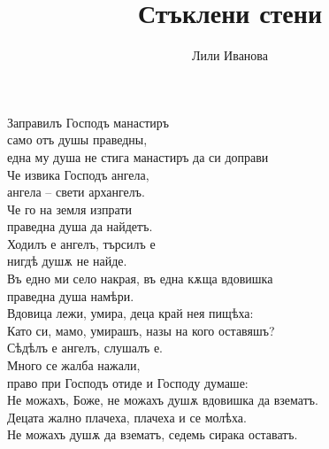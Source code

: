 \documentclass{article}
\title{Стъклени стени}
\author{Лили Иванова}
\begin{document}
\maketitle

Заправилъ Господъ манастиръ \\
само отъ душы праведны, \\
една му душа не стига 
манастиръ да си доправи \\

Че извика Господъ ангела, \\
ангела -- свети архангелъ. \\

Че го на земля изпрати \\
праведна душа да найдетъ. \\

Ходилъ е ангелъ, търсилъ е \\
нигдѣ душѫ не найде. \\

Въ едно ми село накрая, въ една кѫща вдовишка  \\
праведна душа намѣри. \\
Вдовица лежи, умира, деца край нея пищѣха: \\

Като си, мамо, умирашъ, назы на кого оставяшъ? \\

Сѣдѣлъ е ангелъ, слушалъ е.  \\
Много се жалба нажали,  \\
право при Господъ отиде и Господу думаше: \\


Не можахъ, Боже, не можахъ душѫ вдовишка да взематъ. \\
Децата жално плачеха, плачеха и се молѣха. \\
Не можахъ душѫ да взематъ, седемь сирака оставатъ. \\
 
 
 
%
\end{document}
